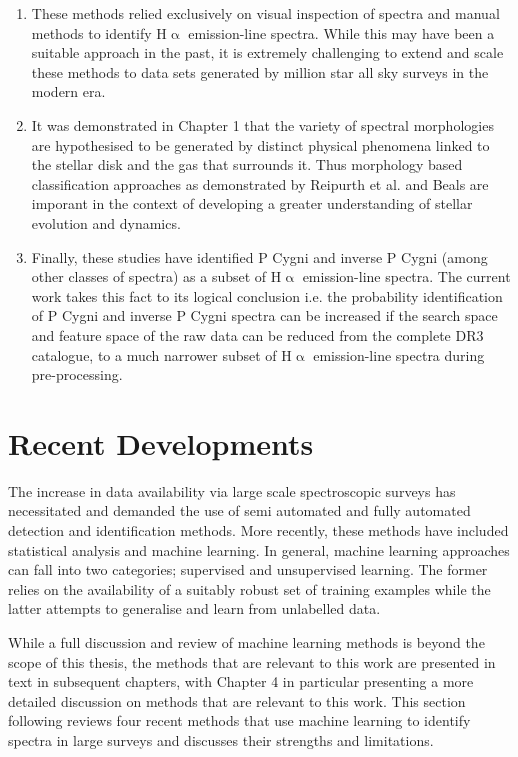 \begin{enumerate}
\item These methods relied exclusively on visual inspection of spectra and manual methods to identify H$\upalpha$ emission-line spectra. While this may have been a suitable approach in the past, it is extremely challenging to extend and scale these methods to data sets generated by million star all sky surveys in the modern era.
\item It was demonstrated in Chapter 1 that the variety of spectral morphologies are hypothesised to be generated by distinct physical phenomena linked to the stellar disk and the gas that surrounds it. Thus morphology based classification approaches as demonstrated by Reipurth et al. and Beals are imporant in the context of developing a greater understanding of stellar evolution and dynamics.
\item Finally, these studies have identified P Cygni and inverse P Cygni (among other classes of spectra) as a subset of H$\upalpha$ emission-line spectra. The current work takes this fact to its logical conclusion i.e. the probability identification of P Cygni and inverse P Cygni spectra can be increased if the search space and feature space of the raw data can be reduced from the complete DR3 catalogue, to a much narrower subset of H$\upalpha$ emission-line spectra during pre-processing. 
\end{enumerate}

\section{Recent Developments}
The increase in data availability via large scale spectroscopic surveys has necessitated and demanded the use of semi automated and fully automated detection and identification methods. More recently, these methods have included statistical analysis and machine learning. In general, machine learning approaches can fall into two categories; supervised and unsupervised learning. The former relies on the availability of a suitably robust set of training examples while the latter attempts to generalise and learn from unlabelled data\cite{hastie2009elements}. 

While a full discussion and review of machine learning methods is beyond the scope of this thesis, the methods that are relevant to this work are presented in text in subsequent chapters, with Chapter 4 in particular presenting a more detailed discussion on methods that are relevant to this work. This section following reviews four recent methods that use machine learning to identify spectra in large surveys and discusses their strengths and limitations.

